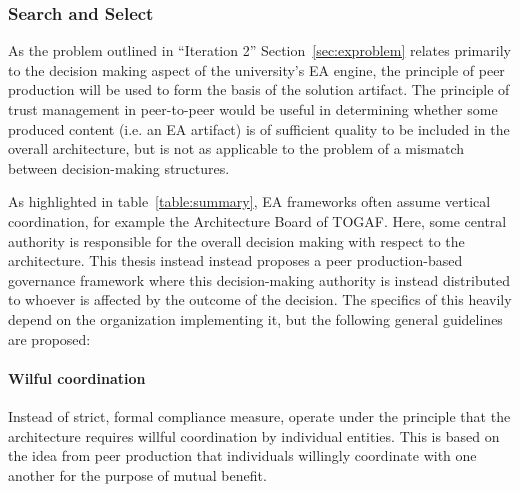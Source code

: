 \subsubsection*{Search and Select}
%
%
As the problem outlined in ``Iteration 2'' Section~\ref{sec:exproblem} relates primarily to the decision making aspect of the university's EA engine, the principle of peer production will be used to form the basis of the solution artifact.  The principle of trust management in peer-to-peer would be useful in determining whether some produced content (i.e. an EA artifact) is of sufficient quality to be included in the overall architecture, but is not as applicable to the problem of a mismatch between decision-making structures. 

As highlighted in table~\ref{table:summary}, EA frameworks often assume vertical coordination, for example the Architecture Board of TOGAF. Here, some central authority is responsible for the overall decision making with respect to the architecture. This thesis instead instead proposes a peer production-based governance framework where this decision-making authority is instead distributed to whoever is affected by the outcome of the decision. The specifics of this heavily depend on the organization implementing it, but the following general guidelines are proposed:

\paragraph*{Wilful coordination} Instead of strict, formal compliance measure, operate under the principle that the architecture requires willful coordination by individual entities. This is based on the idea from peer production that individuals willingly coordinate with one another for the purpose of mutual benefit.


